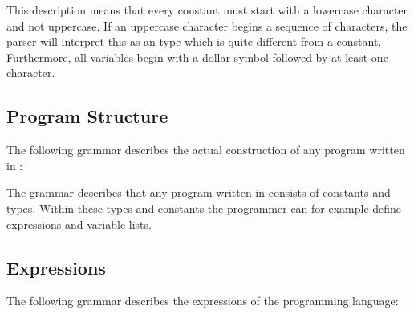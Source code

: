\begin{ebnf}
\end{ebnf}

This description means that every constant must start with a lowercase character and not uppercase. If an uppercase character begins a sequence of characters, the parser will interpret this as an type which is quite different from a constant. Furthermore, all variables begin with a dollar symbol followed by at least one character.

\subsection{Program Structure}
The following grammar describes the actual construction of any program written in \productname{}:

\begin{ebnf}
\end{ebnf}

The grammar describes that any program written in \productname{} consists of constants and types. Within these types and constants the programmer can for example define expressions and variable lists.

\subsection{Expressions}
The following grammar describes the expressions of the programming language:

